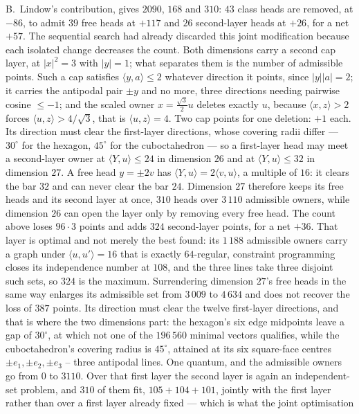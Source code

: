 \documentclass[11pt]{amsart}
\theoremstyle{remark}
\newcommand{\ip}[2]{\langle #1,#2\rangle}
\begin{document}
B.~Lindow's contribution, gives $2090$, $168$ and $310$: $43$ class heads
are removed, at $-86$, to admit $39$ free heads at $+117$ and $26$
second-layer heads at $+26$, for a net $+57$. The sequential search had already
discarded this joint modification because each isolated change decreases the count.
Both dimensions carry a second cap layer, at $|x|^{2}=3$ with $|y|=1$;
what separates them is the number of admissible points.  Such a cap satisfies
$\ip{y}{a}\le2$ whatever direction it points, since $|y||a|=2$; it carries the antipodal
pair $\pm y$ and no more, three directions needing pairwise cosine $\le-1$; and the scaled
owner $x=\tfrac{\sqrt3}{2}u$ deletes exactly $u$, because $\ip{x}{z}>2$ forces
$\ip{u}{z}>4/\sqrt3$, that is $\ip{u}{z}=4$.  Two cap points for one deletion: $+1$ each.
Its direction must clear the first-layer directions, whose covering radii differ ---
$30^{\circ}$ for the hexagon, $45^{\circ}$ for the cuboctahedron --- so a first-layer head
may meet a second-layer owner at $\ip{Y}{u}\le24$ in dimension $26$ and at
$\ip{Y}{u}\le32$ in dimension $27$.  A free head $y=\pm2v$ has $\ip{Y}{u}=2\ip{v}{u}$, a
multiple of $16$: it clears the bar $32$ and can never clear the bar $24$.  Dimension $27$
therefore keeps its free heads and its second layer at once, $310$ heads over $3\,110$
admissible owners, while dimension $26$ can open the layer only by removing every free
head. The count above loses $96\cdot3$ points and adds $324$ second-layer points,
for a net $+36$.  That layer is optimal and not merely the best found:
its $1\,188$ admissible owners carry a graph under $\ip{u}{u'}=16$ that is exactly
$64$-regular, constraint programming closes its independence number at $108$, and the three
lines take three disjoint such sets, so $324$ is the maximum.  Surrendering dimension $27$'s free heads in the same
way enlarges its admissible set from $3\,009$ to $4\,634$ and does not recover the loss of $387$ points.
Its direction must clear the twelve first-layer directions, and that is where the two
dimensions part: the hexagon's six edge midpoints leave a gap of $30^{\circ}$, at which
not one of the $196\,560$ minimal vectors qualifies, while the cuboctahedron's covering
radius is $45^{\circ}$, attained at its six square-face centres $\pm e_{1},\pm e_{2},
\pm e_{3}$ -- three antipodal lines.  One quantum, and the admissible owners go from $0$
to $3110$. Over that first layer the second layer is again an
independent-set problem, and $310$ of them fit, $105+104+101$, jointly with the first
layer rather than over a first layer already fixed --- which is what the joint optimisation
\end{document}
